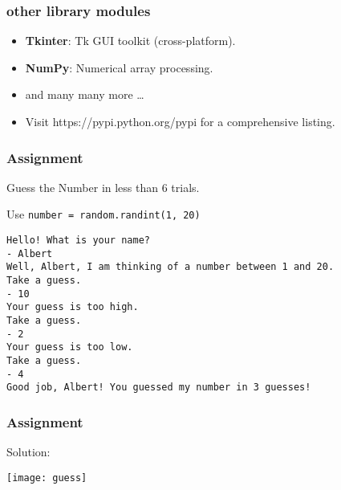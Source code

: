 \begin{frame}[fragile]\frametitle{other library modules}
  \begin{itemize}
  \item \textbf{Tkinter}: Tk GUI toolkit (cross-platform).
     \item \textbf{NumPy}: Numerical array processing.
     \item and many many more \ldots
     \item Visit https://pypi.python.org/pypi for a comprehensive listing.
   \end{itemize}
\end{frame}

\begin{frame}[fragile]  \frametitle{Assignment}
Guess the Number in less than 6 trials. 

Use \lstinline|number = random.randint(1, 20)|


 \begin{lstlisting}
Hello! What is your name?
- Albert
Well, Albert, I am thinking of a number between 1 and 20. 
Take a guess.
- 10
Your guess is too high. 
Take a guess.
- 2
Your guess is too low. 
Take a guess.
- 4
Good job, Albert! You guessed my number in 3 guesses!
\end{lstlisting}
\end{frame}

\begin{frame}[fragile]  \frametitle{Assignment}
Solution:
\begin{center}
\texttt{[image: guess]}
\end{center}
\end{frame}
